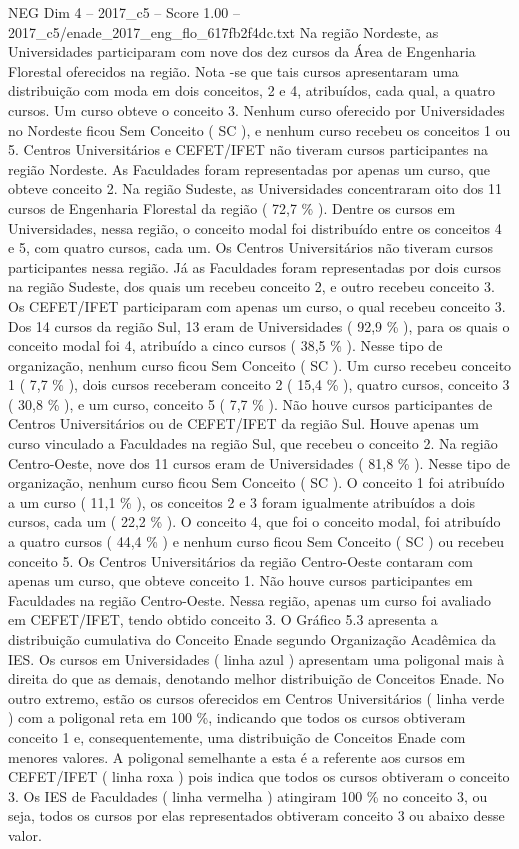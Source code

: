 \begin{textsample}{NEG Dim 4 – 2017\_c5 – Score 1.00 – 2017\_c5/enade\_2017\_eng\_flo\_617fb2f4dc.txt}
Na região Nordeste, as Universidades participaram com nove dos dez cursos da Área de Engenharia Florestal oferecidos na região.
Nota -se que tais cursos apresentaram uma distribuição com moda em dois conceitos, 2 e 4, atribuídos, cada qual, a quatro cursos.
Um curso obteve o conceito 3.
Nenhum curso oferecido por Universidades no Nordeste ficou Sem Conceito ( SC ), e nenhum curso recebeu os conceitos 1 ou 5.
Centros Universitários e CEFET/IFET não tiveram cursos participantes na região Nordeste.
As Faculdades foram representadas por apenas um curso, que obteve conceito 2.
Na região Sudeste, as Universidades concentraram oito dos 11 cursos de Engenharia Florestal da região ( 72,7 \% ).
Dentre os cursos em Universidades, nessa região, o conceito modal foi distribuído entre os conceitos 4 e 5, com quatro cursos, cada um.
Os Centros Universitários não tiveram cursos participantes nessa região.
Já as Faculdades foram representadas por dois cursos na região Sudeste, dos quais um recebeu conceito 2, e outro recebeu conceito 3.
Os CEFET/IFET participaram com apenas um curso, o qual recebeu conceito 3.
Dos 14 cursos da região Sul, 13 eram de Universidades ( 92,9 \% ), para os quais o conceito modal foi 4, atribuído a cinco cursos ( 38,5 \% ).
Nesse tipo de organização, nenhum curso ficou Sem Conceito ( SC ).
Um curso recebeu conceito 1 ( 7,7 \% ), dois cursos receberam conceito 2 ( 15,4 \% ), quatro cursos, conceito 3 ( 30,8 \% ), e um curso, conceito 5 ( 7,7 \% ).
Não houve cursos participantes de Centros Universitários ou de CEFET/IFET da região Sul.
Houve apenas um curso vinculado a Faculdades na região Sul, que recebeu o conceito 2.
Na região Centro-Oeste, nove dos 11 cursos eram de Universidades ( 81,8 \% ).
Nesse tipo de organização, nenhum curso ficou Sem Conceito ( SC ).
O conceito 1 foi atribuído a um curso ( 11,1 \% ), os conceitos 2 e 3 foram igualmente atribuídos a dois cursos, cada um ( 22,2 \% ).
O conceito 4, que foi o conceito modal, foi atribuído a quatro cursos ( 44,4 \% ) e nenhum curso ficou Sem Conceito ( SC ) ou recebeu conceito 5.
Os Centros Universitários da região Centro-Oeste contaram com apenas um curso, que obteve conceito 1.
Não houve cursos participantes em Faculdades na região Centro-Oeste.
Nessa região, apenas um curso foi avaliado em CEFET/IFET, tendo obtido conceito 3.
O Gráfico 5.3 apresenta a distribuição cumulativa do Conceito Enade segundo Organização Acadêmica da IES.
Os cursos em Universidades ( linha azul ) apresentam uma poligonal mais à direita do que as demais, denotando melhor distribuição de Conceitos Enade.
No outro extremo, estão os cursos oferecidos em Centros Universitários ( linha verde ) com a poligonal reta em 100 \%, indicando que todos os cursos obtiveram conceito 1 e, consequentemente, uma distribuição de Conceitos Enade com menores valores.
A poligonal semelhante a esta é a referente aos cursos em CEFET/IFET ( linha roxa ) pois indica que todos os cursos obtiveram o conceito 3.
Os IES de Faculdades ( linha vermelha ) atingiram 100 \% no conceito 3, ou seja, todos os cursos por elas representados obtiveram conceito 3 ou abaixo desse valor.

\end{textsample}
